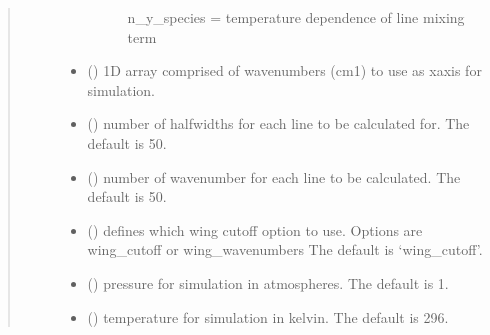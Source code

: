 \documentclass[letterpaper,10pt,english]{sphinxmanual}
\begin{document}
\begin{fulllineitems}
\begin{quote}
\begin{description}
\begin{itemize}
\begin{description}
\sphinxAtStartPar
n\_y\_species = temperature dependence of line mixing term

\end{description}


\item {} 
\sphinxAtStartPar
{} () \textendash{} 1\sphinxhyphen{}D array comprised of wavenumbers (cm\sphinxhyphen{}1) to use as x\sphinxhyphen{}axis for simulation.

\item {} 
\sphinxAtStartPar
{} (\sphinxstyleliteralemphasis{\sphinxupquote{, }}) \textendash{} number of half\sphinxhyphen{}widths for each line to be calculated for. The default is 50.

\item {} 
\sphinxAtStartPar
{} (\sphinxstyleliteralemphasis{\sphinxupquote{, }}) \textendash{} number of wavenumber for each line to be calculated. The default is 50.

\item {} 
\sphinxAtStartPar
{} (\sphinxstyleliteralemphasis{\sphinxupquote{, }}) \textendash{} defines which wing cut\sphinxhyphen{}off option to use.  Options are wing\_cutoff or wing\_wavenumbers The default is ‘wing\_cutoff’.

\item {} 
\sphinxAtStartPar
{} (\sphinxstyleliteralemphasis{\sphinxupquote{, }}) \textendash{} pressure for simulation in atmospheres. The default is 1.

\item {} 
\sphinxAtStartPar
{} (\sphinxstyleliteralemphasis{\sphinxupquote{, }}) \textendash{} temperature for simulation in kelvin. The default is 296.


\end{itemize}
\end{description}
\end{quote}
\end{fulllineitems}
\end{document}
